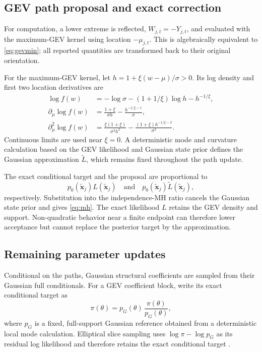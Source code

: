 \documentclass[11pt,a4paper]{article}
\begin{document}
	\subsection{GEV path proposal and exact correction}
	
	For computation, a lower extreme is reflected, \(W_{j,t}=-Y_{j,t}\), and
	evaluated with the maximum-GEV kernel using location \(-\mu_{j,t}\).
	This is algebraically equivalent to \cref{eq:gevmin}; all reported
	quantities are transformed back to their original orientation.
	
	For the maximum-GEV kernel, let
	\(h=1+\xi(w-\mu)/\sigma>0\). Its log density and first two location
	derivatives are
	\begin{align}
		\log f(w)
		&=-\log\sigma-(1+1/\xi)\log h-h^{-1/\xi},\nonumber\\
		\partial_\mu\log f(w)
		&=\frac{1+\xi}{\sigma h}
		-\frac{h^{-1/\xi-1}}{\sigma},\nonumber\\
		\partial_\mu^2\log f(w)
		&=\frac{\xi(1+\xi)}{\sigma^2h^2}
		-\frac{(1+\xi)h^{-1/\xi-2}}{\sigma^2}.
		\label{eq:supp-gev-derivatives}
	\end{align}
	Continuous limits are used near \(\xi=0\). A deterministic mode and
	curvature calculation based on the GEV likelihood and Gaussian state prior
	defines the Gaussian approximation
	\(\widetilde L\), which remains fixed throughout the path update.
	
	The exact conditional target and the proposal are proportional to
	\[
	p_0(\widetilde{\bm x}_j)L(\widetilde{\bm x}_j)
	\quad\text{and}\quad
	p_0(\widetilde{\bm x}_j)\widetilde L(\widetilde{\bm x}_j),
	\]
	respectively. Substitution into the independence-MH ratio cancels the
	Gaussian state prior and gives \cref{eq:mh}. The exact likelihood \(L\)
	retains the GEV density and support. Non-quadratic behavior near a
	finite endpoint can therefore lower acceptance but cannot replace the
	posterior target by the approximation.
	
	\subsection{Remaining parameter updates}
	
	Conditional on the paths, Gaussian structural coefficients are sampled from
	their Gaussian full conditionals. For a GEV coefficient block, write its
	exact conditional target as
	\[
	\pi(\theta)
	=
	p_G(\theta)\,
	\frac{\pi(\theta)}{p_G(\theta)},
	\]
	where \(p_G\) is a fixed, full-support Gaussian reference obtained from a
	deterministic local mode calculation. Elliptical slice sampling uses
	\(\log\pi-\log p_G\) as its residual log likelihood and therefore retains
	the exact conditional target \citep{murray2010}.
	
\end{document}
